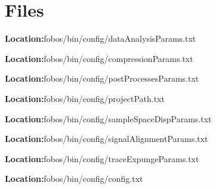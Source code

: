 \section{Files}
\begin{tcolorbox}[colback=yellow!10!white,colframe=green!75!black,title=dataAnalysisParams.txt]
	\textbf{Location:}fobos/bin/config/dataAnalysisParams.txt
	\tcblower
	\footnotesize
	
	\label{file:1}
\end{tcolorbox}
\begin{tcolorbox}[colback=yellow!10!white,colframe=green!75!black,title=compressionParams.txt]
	\textbf{Location:}fobos/bin/config/compressionParams.txt
	\tcblower
	\footnotesize
	
	\label{file:1}
\end{tcolorbox}
\begin{tcolorbox}[colback=yellow!10!white,colframe=green!75!black,title=postProcessesParams.txt]
	\textbf{Location:}fobos/bin/config/postProcessesParams.txt
	\tcblower
	\footnotesize
	
	\label{file:1}
\end{tcolorbox}
\begin{tcolorbox}[colback=yellow!10!white,colframe=green!75!black,title=projectPath.txt]
	\textbf{Location:}fobos/bin/config/projectPath.txt
	\tcblower
	\footnotesize
	
	\label{file:1}
\end{tcolorbox}
\begin{tcolorbox}[colback=yellow!10!white,colframe=green!75!black,title=sampleSpaceDispParams.txt]
	\textbf{Location:}fobos/bin/config/sampleSpaceDispParams.txt
	\tcblower
	\footnotesize
	
	\label{file:1}
\end{tcolorbox}
\begin{tcolorbox}[colback=yellow!10!white,colframe=green!75!black,title=signalAlignmentParams.txt]
	\textbf{Location:}fobos/bin/config/signalAlignmentParams.txt
	\tcblower
	\footnotesize
	
	\label{file:1}
\end{tcolorbox}
\begin{tcolorbox}[colback=yellow!10!white,colframe=green!75!black,title=traceExpungeParams.txt]
	\textbf{Location:}fobos/bin/config/traceExpungeParams.txt
	\tcblower
	\footnotesize
	
	\label{file:1}
\end{tcolorbox}

\begin{tcolorbox}[colback=yellow!10!white,colframe=green!75!black,title=config.txt]
	\textbf{Location:}fobos/bin/config/config.txt
	\tcblower
	\footnotesize
	
	\label{file:1}
\end{tcolorbox}

%